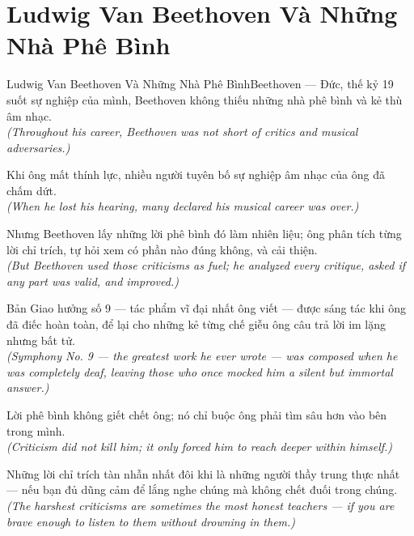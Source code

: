 \section{Ludwig Van Beethoven Và Những Nhà Phê Bình}
\begin{truyen}{Ludwig Van Beethoven Và Những Nhà Phê Bình}{Beethoven --- Đức, thế kỷ 19}
 suốt sự nghiệp của mình, Beethoven không thiếu những nhà phê bình và kẻ thù âm nhạc.\\[4pt]
\textit{(Throughout his career, Beethoven was not short of critics and musical adversaries.)}

Khi ông mất thính lực, nhiều người tuyên bố sự nghiệp âm nhạc của ông đã chấm dứt.\\[4pt]
\textit{(When he lost his hearing, many declared his musical career was over.)}

Nhưng Beethoven lấy những lời phê bình đó làm nhiên liệu; ông phân tích từng lời chỉ trích, tự hỏi xem có phần nào đúng không, và cải thiện.\\[4pt]
\textit{(But Beethoven used those criticisms as fuel; he analyzed every critique, asked if any part was valid, and improved.)}

Bản Giao hưởng số 9 --- tác phẩm vĩ đại nhất ông viết --- được sáng tác khi ông đã điếc hoàn toàn, để lại cho những kẻ từng chế giễu ông câu trả lời im lặng nhưng bất tử.\\[4pt]
\textit{(Symphony No. 9 --- the greatest work he ever wrote --- was composed when he was completely deaf, leaving those who once mocked him a silent but immortal answer.)}

Lời phê bình không giết chết ông; nó chỉ buộc ông phải tìm sâu hơn vào bên trong mình.\\[4pt]
\textit{(Criticism did not kill him; it only forced him to reach deeper within himself.)}

\end{truyen}
\begin{baihoc}
  Những lời chỉ trích tàn nhẫn nhất đôi khi là những người thầy trung thực nhất --- nếu bạn đủ dũng cảm để lắng nghe chúng mà không chết đuối trong chúng.\\[4pt]
  \textit{(The harshest criticisms are sometimes the most honest teachers --- if you are brave enough to listen to them without drowning in them.)}
\end{baihoc}

